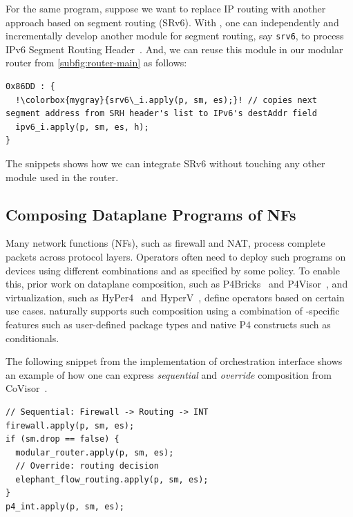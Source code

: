 \documentclass[letterpaper,twocolumn,10pt]{article}
\begin{document}
%
For the same program, suppose we want to replace IP routing with
another approach based on segment routing (SRv6). With \ulang, one can
independently and incrementally develop another module for segment
routing, say \texttt{srv6}, to process IPv6 Segment Routing
Header~\cite{srh}. And, we can reuse this module in our modular router
from \cref{subfig:router-main} as follows:

\begin{lstlisting}[frame=none, escapechar=!]
0x86DD : {
  !\colorbox{mygray}{srv6\_i.apply(p, sm, es);}! // copies next segment address from SRH header's list to IPv6's destAddr field
  ipv6_i.apply(p, sm, es, h);
}
\end{lstlisting}
The snippets shows how we can integrate SRv6 without touching any
other module used in the router.




\subsection{Composing Dataplane Programs of NFs}
\label{subsection:composing-dataplane-programs-of-NFs}

Many network functions (NFs), such as firewall and NAT, process
complete packets across protocol layers. Operators often need to
deploy such programs on devices using different combinations and as
specified by some policy. To enable this, prior work on dataplane
composition, such as P4Bricks~\cite{soni:hal-01632431} and
P4Visor~\cite{Zheng:2018:PLV:3281411.3281436}, and virtualization,
such as HyPer4~\cite{Hancock:2016:HUP:2999572.2999607} and
HyperV~\cite{8038396}, define operators based on certain use cases.
\ulang naturally supports such composition using a combination of
\ulang-specific features such as user-defined package types and native
P4 constructs such as conditionals.

%
The following \ulang snippet from the implementation of orchestration
interface shows an example of how one can express \emph{sequential}
and \emph{override} composition from CoVisor~\cite{188954}.
\begin{lstlisting}[frame=none, escapechar=!]
// Sequential: Firewall -> Routing -> INT
firewall.apply(p, sm, es);
if (sm.drop == false) {
  modular_router.apply(p, sm, es);
  // Override: routing decision
  elephant_flow_routing.apply(p, sm, es);
}
p4_int.apply(p, sm, es);
\end{lstlisting}
\end{document}
